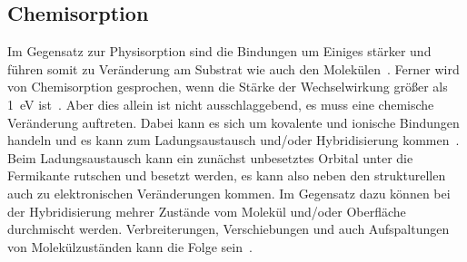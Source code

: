         \subsection{Chemisorption}
            Im Gegensatz zur Physisorption sind die Bindungen um Einiges stärker und führen somit zu Veränderung am Substrat wie auch den Molekülen~\cite{bergenti_spinterface_2019}.
            Ferner wird von Chemisorption gesprochen, wenn die Stärke der Wechselwirkung größer als \SI{1}{\electronvolt} ist~\cite{muscat_chemisorption_1978}.
            Aber dies allein ist nicht ausschlaggebend, es muss eine chemische Veränderung auftreten.
            Dabei kann es sich um kovalente und ionische Bindungen handeln und es kann zum Ladungsaustausch und/oder Hybridisierung kommen~\cite{harutyunyan_hybridisation_2013}.
            Beim Ladungsaustausch kann ein zunächst unbesetztes Orbital unter die Fermikante rutschen und besetzt werden, es kann also neben den strukturellen auch zu elektronischen Veränderungen kommen.
            Im Gegensatz dazu können bei der Hybridisierung mehrer Zustände vom Molekül und/oder Oberfläche durchmischt werden.
            Verbreiterungen, Verschiebungen und auch Aufspaltungen von Molekülzuständen kann die Folge sein~\cite{IF_1}.

